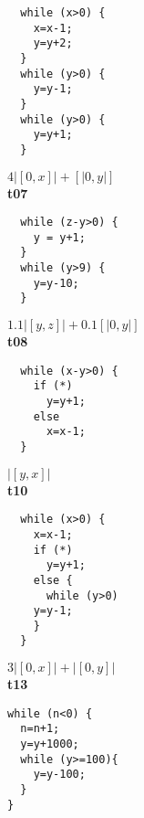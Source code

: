 \documentclass[nocopyrightspace,preprint]{sigplanconf}
\begin{document}
\begin{figure*}[t!]
\newlength{\progwidth}
\setlength{\progwidth}{.19\linewidth}
  \centering

  \begin{minipage}[b]{\progwidth}
    \begin{center}
   \begin{lstlisting}
  while (x>0) {
    x=x-1;
    y=y+2;
  }
  while (y>0) {
    y=y-1;
  }
  while (y>0) {
    y=y+1;
  }
   \end{lstlisting}

$4|[0,x]| + [|0,y|]$
\\[.7\baselineskip]
      {\bf t07}
    \end{center}
  \end{minipage}%
%
%
%
  \begin{minipage}[b]{\progwidth}
    \begin{center}
   \begin{lstlisting}
  while (z-y>0) {
    y = y+1;
  }
  while (y>9) {
    y=y-10;
  }
   \end{lstlisting}

$1.1|[y,z]| + 0.1[|0,y|]$
\\[.7\baselineskip] 
      {\bf t08}
    \end{center}
  \end{minipage}
%
%
%
  \begin{minipage}[b]{\progwidth}
    \begin{center}
   \begin{lstlisting}
  while (x-y>0) {
    if (*)
      y=y+1;
    else
      x=x-1;
  }
   \end{lstlisting}

$|[y,x]|$
\\[.7\baselineskip]
      {\bf t10}
    \end{center}
  \end{minipage}
%
%
%
  \begin{minipage}[b]{\progwidth}
    \begin{center}
   \begin{lstlisting}
  while (x>0) {
    x=x-1;
    if (*) 
      y=y+1;
    else {
      while (y>0)
	y=y-1;
    }
  }
   \end{lstlisting}

$3|[0,x]| + |[0,y]|$
\\[.7\baselineskip]
      {\bf t13}
    \end{center}
  \end{minipage}
%
%
%
  \begin{minipage}[b]{\progwidth}
    \begin{center}
   \begin{lstlisting}
while (n<0) {
  n=n+1;
  y=y+1000;
  while (y>=100){
    y=y-100;
  }
}
   \end{lstlisting}


\end{center}
\end{minipage}
\end{figure*}
\end{document}
